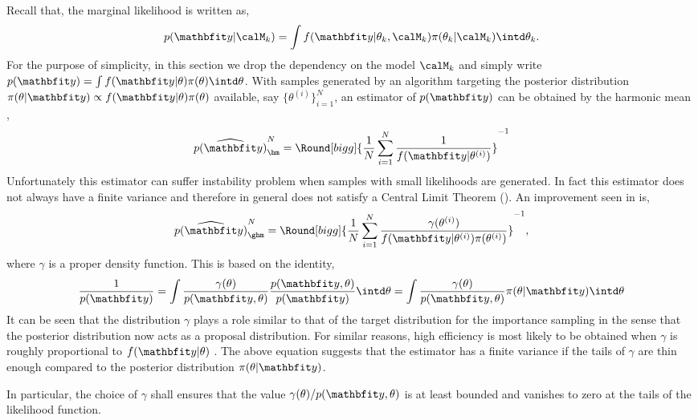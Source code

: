 Recall that, the marginal likelihood is written as,
\begin{equation*}
  p(\data|\calM_k) = \int
  f(\data|\theta_k,\calM_k)\pi(\theta_k|\calM_k)\intd\theta_k.
\end{equation*}
For the purpose of simplicity, in this section we drop the dependency on the model $\calM_k$ and simply write $p(\data) = \int f(\data|\theta)\pi(\theta)\intd\theta$. With samples generated by an \mcmc algorithm targeting the posterior distribution $\pi(\theta|\data) \propto f(\data|\theta) \pi(\theta)$ available, say $\{\theta^{(i)}\}_{i=1}^N$, an estimator of $p(\data)$ can be obtained by the harmonic mean \cite{Newton:1994wm},
\begin{equation}
  \widehat{p(\data)}_{\hm}^N =
  \Round[bigg]{\frac{1}{N}\sum_{i=1}^N\frac{1}{f(\data|\theta^{(i)})}}^{-1}
\end{equation}
Unfortunately this estimator can suffer instability problem when samples with small likelihoods are generated. In fact this estimator does not always have a finite variance and therefore in general does not satisfy a Central Limit Theorem (\clt). An improvement seen in \cite{Kass:1995vb} is,
\begin{equation}
  \widehat{p(\data)}_{\ghm}^N = \Round[bigg]{
    \frac{1}{N}\sum_{i=1}^N
    \frac{\gamma(\theta^{(i)})}{f(\data|\theta^{(i)})\pi(\theta^{(i)})}}^{-1},
\end{equation}
where $\gamma$ is a proper density function. This is based on the identity,
\begin{equation}
  \frac{1}{p(\data)}
  = \int \frac{\gamma(\theta)}{p(\data,\theta)}
  \frac{p(\data,\theta)}{p(\data)} \intd \theta
  = \int \frac{\gamma(\theta)}{p(\data,\theta)} \pi(\theta|\data) \intd \theta
\end{equation}
It can be seen that the distribution $\gamma$ plays a role similar to that of the target distribution for the importance sampling in the sense that the posterior distribution now acts as a proposal distribution. For similar reasons, high efficiency is most likely to be obtained when $\gamma$ is roughly proportional to $f(\data|\theta)$ \cite{Kass:1995vb}. The above equation suggests that the estimator has a finite variance if the tails of $\gamma$ are thin enough compared to the posterior distribution $\pi(\theta|\data)$.
\begin{draftpar}
In particular, the choice of $\gamma$ shall ensures that the value $\gamma(\theta)/p(\data,\theta)$ is at least bounded and vanishes to zero at the tails of the likelihood function.
\end{draftpar}
